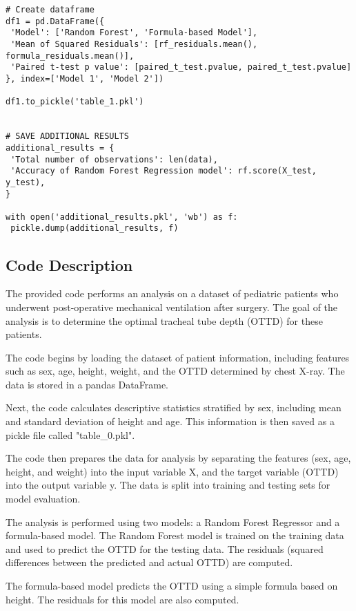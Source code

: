 \documentclass[11pt]{article}
\begin{document}
\begin{verbatim}
# Create dataframe
df1 = pd.DataFrame({
 'Model': ['Random Forest', 'Formula-based Model'],
 'Mean of Squared Residuals': [rf_residuals.mean(), formula_residuals.mean()],
 'Paired t-test p value': [paired_t_test.pvalue, paired_t_test.pvalue]
}, index=['Model 1', 'Model 2'])

df1.to_pickle('table_1.pkl')


# SAVE ADDITIONAL RESULTS
additional_results = {
 'Total number of observations': len(data),
 'Accuracy of Random Forest Regression model': rf.score(X_test, y_test),
}

with open('additional_results.pkl', 'wb') as f:
 pickle.dump(additional_results, f)

\end{verbatim}

\subsection{Code Description}

The provided code performs an analysis on a dataset of pediatric patients who underwent post-operative mechanical ventilation after surgery. The goal of the analysis is to determine the optimal tracheal tube depth (OTTD) for these patients.

The code begins by loading the dataset of patient information, including features such as sex, age, height, weight, and the OTTD determined by chest X-ray. The data is stored in a pandas DataFrame.

Next, the code calculates descriptive statistics stratified by sex, including mean and standard deviation of height and age. This information is then saved as a pickle file called "table\_0.pkl".

The code then prepares the data for analysis by separating the features (sex, age, height, and weight) into the input variable X, and the target variable (OTTD) into the output variable y. The data is split into training and testing sets for model evaluation.

The analysis is performed using two models: a Random Forest Regressor and a formula-based model. The Random Forest model is trained on the training data and used to predict the OTTD for the testing data. The residuals (squared differences between the predicted and actual OTTD) are computed.

The formula-based model predicts the OTTD using a simple formula based on height. The residuals for this model are also computed.
\end{document}
